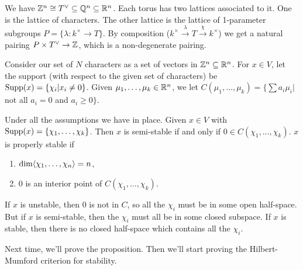 We have $\mathbb{Z}^n\cong T^\vee\subseteq\mathbb{Q}^n\subseteq \mathbb{R}^n$. Each torus has two lattices associated to it. One is the lattice of characters. The other lattice is the lattice of 1-parameter subgroups $P=\{\lambda\colon k^\times\to T\}$. By composition ($k^\times\xrightarrow\lambda T\xrightarrow{\chi} k^\times$) we get a natural pairing $P\times T^\vee\to \mathbb{Z}$, which is a non-degenerate pairing.

Consider our set of $N$ characters as a set of vectors in $\mathbb{Z}^n\subseteq \mathbb{R}^n$. For $x\in V$, let the support (with respect to the given set of characters) be $\operatorname{Supp}(x)=\{\chi_i|x_i\neq 0\}$. Given $\mu_1,\dots, \mu_k\in \mathbb{R}^n$, we let $C(\mu_1,\dots, \mu_k)=\{\sum a_i\mu_i|$not all $a_i=0$ and $a_i\ge 0\}$.
\begin{proposition}
 Under all the assumptions we have in place. Given $x\in V$ with $\operatorname{Supp}(x)=\{\chi_1,\dots, \chi_k\}$. Then $x$ is semi-stable if and only if $0\in C(\chi_1,\dots, \chi_k)$. $x$ is properly stable if
 \begin{enumerate}
  \item $\dim \langle\chi_1,\dots, \chi_n\rangle=n$,
  \item $0$ is an interior point of $C(\chi_1,\dots, \chi_k)$.
 \end{enumerate}
\end{proposition}
If $x$ is unstable, then $0$ is not in $C$, so all the $\chi_i$ must be in some open half-space. But if $x$ is semi-stable, then the $\chi_i$ must all be in some closed subspace. If $x$ is stable, then there is no closed half-space which contains all the $\chi_i$.

Next time, we'll prove the proposition. Then we'll start proving the Hilbert-Mumford criterion for stability.


